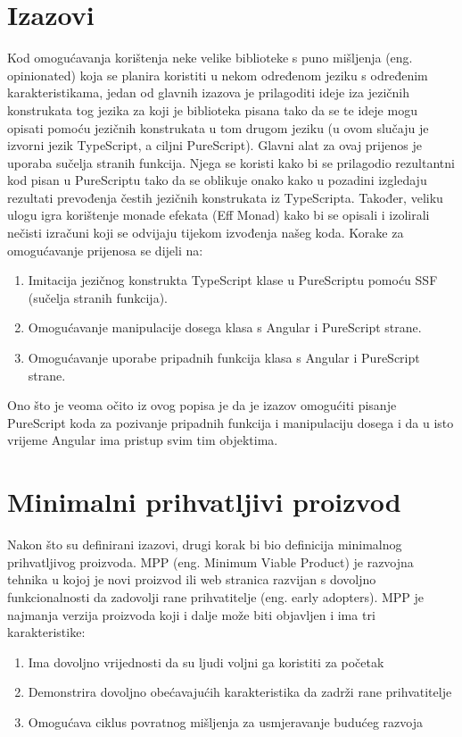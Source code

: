 \documentclass[times, utf8, zavrsni]{fer}
\begin{document}
\section{Izazovi}
Kod omogućavanja korištenja neke velike biblioteke s puno mišljenja (eng. opinionated) koja se planira koristiti u nekom određenom jeziku s određenim karakteristikama, jedan od glavnih izazova je prilagoditi ideje iza jezičnih konstrukata tog jezika za koji je biblioteka pisana tako da se te ideje mogu opisati pomoću jezičnih konstrukata u tom drugom jeziku (u ovom slučaju je izvorni jezik TypeScript, a ciljni PureScript). Glavni alat za ovaj prijenos je uporaba sučelja stranih funkcija. Njega se koristi kako bi se prilagodio rezultantni kod pisan u PureScriptu tako da se oblikuje onako kako u pozadini izgledaju rezultati prevođenja čestih jezičnih konstrukata iz TypeScripta. Također, veliku ulogu igra korištenje monade efekata (Eff Monad) kako bi se opisali i izolirali nečisti izračuni koji se odvijaju tijekom izvođenja našeg koda.
Korake za omogućavanje prijenosa se dijeli na:
\begin{enumerate}
\item Imitacija jezičnog konstrukta TypeScript klase u PureScriptu pomoću SSF (sučelja stranih funkcija).
\item Omogućavanje manipulacije dosega klasa s Angular i PureScript strane.
\item Omogućavanje uporabe pripadnih funkcija klasa s Angular i PureScript strane.
\end{enumerate}

Ono što je veoma očito iz ovog popisa je da je izazov omogućiti pisanje PureScript koda za pozivanje pripadnih funkcija i manipulaciju dosega i da u isto vrijeme Angular ima pristup svim tim objektima.

\section{Minimalni prihvatljivi proizvod}
Nakon što su definirani izazovi, drugi korak bi bio definicija minimalnog prihvatljivog proizvoda. 
MPP (eng. Minimum Viable Product) je razvojna tehnika u kojoj je novi proizvod ili web stranica razvijan s dovoljno funkcionalnosti da zadovolji rane prihvatitelje (eng. early adopters).
MPP je najmanja verzija proizvoda koji i dalje može biti objavljen i ima tri karakteristike:
\begin{enumerate}
\item Ima dovoljno vrijednosti da su ljudi voljni ga koristiti za početak
\item Demonstrira dovoljno obećavajućih karakteristika da zadrži rane prihvatitelje
\item Omogućava ciklus povratnog mišljenja za usmjeravanje budućeg razvoja
\end{enumerate}
\end{document}
